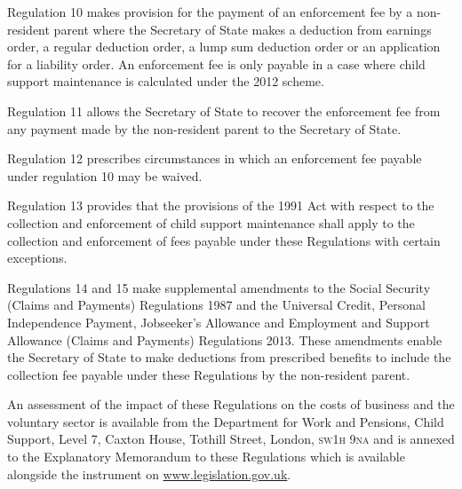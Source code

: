 \documentclass[12pt,a4paper]{article}
\begin{document}
Regulation 10 makes provision for the payment of an enforcement fee by a non-resident parent where the Secretary of State makes a deduction from earnings order, a regular deduction order, a lump sum deduction order or an application for a liability order. An enforcement fee is only payable in a case where child support maintenance is calculated under the 2012 scheme.

Regulation 11 allows the Secretary of State to recover the enforcement fee from any payment made by the non-resident parent to the Secretary of State.

Regulation 12 prescribes circumstances in which an enforcement fee payable under regulation 10 may be waived.

Regulation 13 provides that the provisions of the 1991 Act with respect to the collection and enforcement of child support maintenance shall apply to the collection and enforcement of fees payable under these Regulations with certain exceptions.

Regulations 14 and 15 make supplemental amendments to the Social Security (Claims and Payments) Regulations 1987 and the Universal Credit, Personal Independence Payment, Jobseeker’s Allowance and Employment and Support Allowance (Claims and Payments) Regulations 2013. These amendments enable the Secretary of State to make deductions from prescribed benefits to include the collection fee payable under these Regulations by the non-resident parent.

An assessment of the impact of these Regulations on the costs of business and the voluntary sector is available from the Department for Work and Pensions, Child Support, Level 7, Caxton House, Tothill Street, London, \textsc{\lowercase{SW1H 9NA}} and is annexed to the Explanatory Memorandum to these Regulations which is available alongside the instrument on \url{www.legislation.gov.uk}.
\end{document}
